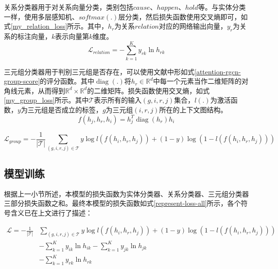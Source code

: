 关系分类器用于对关系向量分类，类别包括$cause$、$happen$、$hold$等。与实体分类一样，使用多层感知机、$softmax(.)$层分类，然后损失函数使用交叉熵即可，如式\ref{my_relation_loss}所示。其中，$h_r$为关系$relation$对应的网络输出向量，$y_r$为关系的标注向量，$k$表示向量第$k$维度。
\begin{equation}
    \mathcal{L}_{relation}=- \sum_{k=1}^{K} y_{r k} \ln h_{r k}
    \label{my_relation_loss}
\end{equation}

三元组分类器用于判别三元组是否存在，可以使用文献\parencite{trouillon2016complex}中形如式\ref{attention-rgcn-group-score}的评分函数。其中$\operatorname{diag}\left(.\right)$将$h_r\in\mathbb{R}^{d}$中每一个元素当作二维矩阵的对角线元素，从而得到$\mathbb{R}^{d}\times \mathbb{R}^{d}$的二维矩阵。损失函数使用交叉熵，如式\ref{my_group_loss}所示。其中$\mathcal{T}$表示所有的输入$(g, i, r, j)$集合，$l(.)$为激活函数，$y$为三元组是否成立的标签，$g$为三元组$(i, r, j)$所在的上下文图结构。
\begin{equation}
    f(h_{j}, h_{r}, h_{i})=h_{j}^{T} \operatorname{diag}\left(h_{r}\right) h_{i}
    \label{attention-rgcn-group-score}
\end{equation}

\begin{equation}
    \mathcal{L}_{group}= -\frac{1}{|\mathcal{T}|}  \sum_{(g, i, r, j) \in \mathcal{T}} y \log l(f(h_i, h_r, h_j))+(1-y) \log (1-l(f(h_i, h_r, h_j)))
    \label{my_group_loss}
\end{equation}

\subsection{模型训练}\label{representation-paras-learn}
根据上一小节所述，本模型的损失函数为实体分类器、关系分类器、三元组分类器三部分损失函数之和。最终本模型的损失函数如式\ref{represent-loss-all}所示，各个符号含义已在上文进行了描述：

\begin{equation}
    \begin{aligned}
    \mathcal{L}=-\frac{1}{|\mathcal{T}|}&  \sum_{(g, i, r, j) \in \mathcal{T}} y \log l(f(h_i, h_r, h_j))+(1-y) \log (1-l(f(h_i, h_r, h_j)))\\
    &- \sum_{k=1}^{K} y_{i k} \ln h_{i k} - \sum_{k=1}^{K} y_{j k} \ln h_{j k}\\
    &- \sum_{k=1}^{K} y_{r k} \ln h_{r k}\\
    \end{aligned}
    \label{represent-loss-all}
\end{equation}

